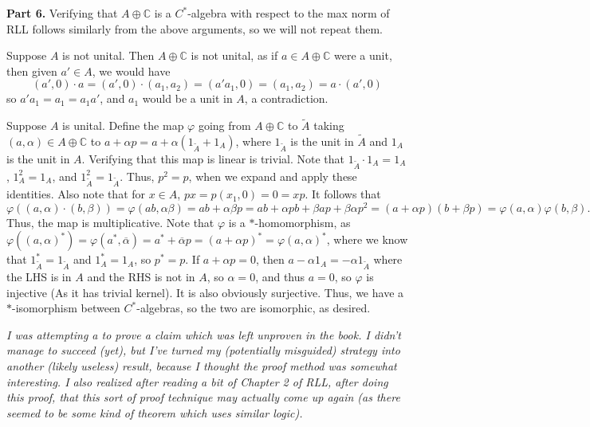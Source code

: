 \documentclass[aps,pra,showpacs,notitlepage,onecolumn,superscriptaddress,nofootinbib]{revtex4-1}
\newcommand{\hhrulefill}{\hspace{-1.0em}\hrulefill}
\theoremstyle{definition}
\begin{document}
\noindent \textbf{Part 6.} Verifying that $A \oplus \mathbb{C}$ is a $C^{*}$-algebra with respect to the max norm of RLL follows similarly from the above arguments, so we will not repeat them.

Suppose $A$ is not unital. Then $A \oplus \mathbb{C}$ is not unital, as if $a \in A \oplus \mathbb{C}$ were a unit, then given $a' \in A$, we would have
\begin{equation}
  (a', 0) \cdot a = (a', 0) \cdot (a_1, a_2) = (a' a_1, 0) = (a_1, a_2) = a \cdot (a', 0)
  \end{equation}
so $a' a_1 = a_1 = a_1 a'$, and $a_1$ would be a unit in $A$, a contradiction.

Suppose $A$ is unital. Define the map $\varphi$ going from $A \oplus \mathbb{C}$ to $\widetilde{A}$ taking $(a, \alpha) \in A \oplus \mathbb{C}$ to $a + \alpha p = a + \alpha (1_{\widetilde{A}} + 1_{A})$, where $1_{\widetilde{A}}$ is the unit in $\widetilde{A}$ and $1_{A}$ is the unit in $A$.
Verifying that this map is linear is trivial.  Note that $1_{\widetilde{A}} \cdot 1_A = 1_A$, $1_A^2 = 1_A$, and $1_{\widetilde{A}}^2 = 1_{\widetilde{A}}$. Thus, $p^2 = p$, when we expand and apply these identities. Also note that for $x \in A$, $p x = p(x_1, 0) = 0 = xp$. It follows that
\begin{equation}
  \varphi((a, \alpha) \cdot (b, \beta)) = \varphi(ab, \alpha \beta) = ab + \alpha \beta p = ab + \alpha p b + \beta a p + \beta \alpha p^2 = (a + \alpha p)(b + \beta p) = \varphi(a, \alpha) \varphi(b, \beta).
\end{equation}
Thus, the map is multiplicative. Note that $\varphi$ is a $*$-homomorphism, as $\varphi((a, \alpha)^{*}) = \varphi(a^{*}, \overline{\alpha}) = a^{*} + \overline{\alpha} p = (a + \alpha p)^{*} = \varphi(a, \alpha)^{*}$,
where we know that $1_{\widetilde{A}}^{*} = 1_{\widetilde{A}}$ and $1_A^{*} = 1_A$, so $p^{*} = p$. If $a + \alpha p = 0$, then $a - \alpha 1_A = - \alpha 1_{\widetilde{A}}$ where the LHS is in $A$ and the RHS is not in $A$, so $\alpha = 0$, and thus $a = 0$,
so $\varphi$ is injective (As it has trivial kernel). It is also obviously surjective. Thus, we have a $*$-isomorphism between $C^{*}$-algebras, so the two are isomorphic, as desired.

\hhrulefill

\noindent \textit{I was attempting a to prove a claim which was left unproven in the book. I didn't manage to succeed (yet), but I've turned my (potentially misguided) strategy into another (likely useless) result,
  because I thought the proof method was somewhat interesting. I also realized after reading a bit of Chapter 2 of RLL, after doing this proof, that this sort of proof technique may actually come up again (as there seemed to
  be some kind of theorem which uses similar logic).}
\end{document}
